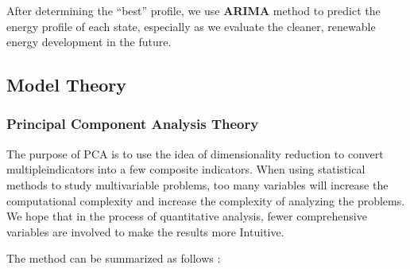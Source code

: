\documentclass{mcmthesis}
\begin{document}
    After determining the “best” profile, we use \textbf{ARIMA} method to predict the energy profile of each state, especially as we evaluate the cleaner, renewable energy development in the future.

    \subsection{Model Theory}
        \subsubsection{Principal Component Analysis Theory}
        The purpose of PCA is to use the idea of dimensionality reduction to convert multipleindicators into a few composite indicators. When using statistical methods to study multivariable problems, too many variables will increase the computational complexity and increase the complexity of analyzing the problems. We hope that in the process of quantitative analysis, fewer comprehensive variables are involved to make the results more Intuitive.

        The method can be summarized as follows :
        
\end{document}
